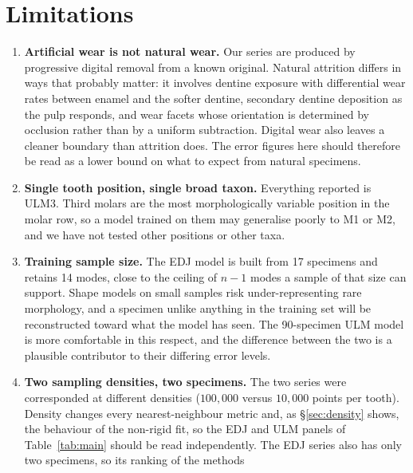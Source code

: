 \documentclass[10pt,a4paper,twocolumn]{article}
\begin{document}
\section{Limitations}
\label{sec:limitations}

\begin{enumerate}
  \item \textbf{Artificial wear is not natural wear.} Our series are produced by
        progressive digital removal from a known original. Natural attrition
        differs in ways that probably matter: it involves dentine exposure with
        differential wear rates between enamel and the softer dentine, secondary
        dentine deposition as the pulp responds, and wear facets whose
        orientation is determined by occlusion rather than by a uniform
        subtraction. Digital wear also leaves a cleaner boundary than attrition
        does. The error figures here should therefore be read as a lower bound on
        what to expect from natural specimens.
  \item \textbf{Single tooth position, single broad taxon.} Everything reported
        is ULM3. Third molars are the most morphologically variable position in
        the molar row, so a model trained on them may generalise poorly to M1 or
        M2, and we have not tested other positions or other taxa.
  \item \textbf{Training sample size.} The EDJ model is built from 17 specimens
        and retains 14 modes, close to the ceiling of $n-1$ modes a sample of
        that size can support. Shape models on small samples risk
        under-representing rare morphology, and a specimen unlike anything in the
        training set will be reconstructed toward what the model has seen. The
        90-specimen ULM model is more comfortable in this respect, and the
        difference between the two is a plausible contributor to their differing
        error levels.
  \item \textbf{Two sampling densities, two specimens.} The two series were
        corresponded at different densities ($100{,}000$ versus $10{,}000$ points
        per tooth). Density changes every nearest-neighbour metric and, as
        \S\ref{sec:density} shows, the behaviour of the non-rigid fit, so the EDJ
        and ULM panels of Table~\ref{tab:main} should be read independently. The
        EDJ series also has only two specimens, so its ranking of the methods

\end{enumerate}
\end{document}
